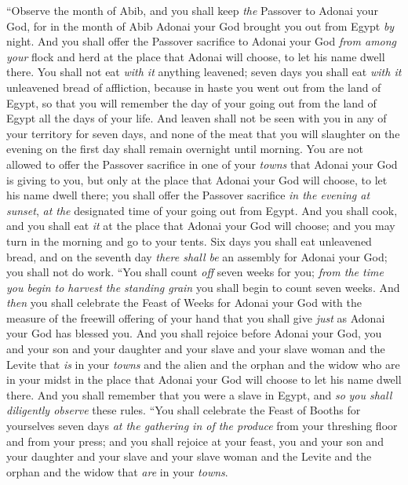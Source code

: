 \begin{biblechapter} %
\verse “Observe the month of Abib, and you shall keep \textit{the} Passover to Adonai your God, for in the month of Abib Adonai your God brought you out from Egypt \textit{by} night.
\verse And you shall offer the Passover sacrifice to Adonai your God \textit{from among} \textit{your} flock and herd at the place that Adonai will choose, to let his name dwell there.
\verse You shall not eat \textit{with it} anything leavened; seven days you shall eat \textit{with it} unleavened bread of affliction, because in haste you went out from the land of Egypt, so that you will remember the day of your going out from the land of Egypt all the days of your life.
\verse And leaven shall not be seen with you in any of your territory for seven days, and none of the meat that you will slaughter on the evening on the first day shall remain overnight until morning.
\verse You are not allowed to offer the Passover sacrifice in one of your \textit{towns} that Adonai your God is giving to you,
\verse but only at the place that Adonai your God will choose, to let his name dwell there; you shall offer the Passover sacrifice \textit{in the evening at sunset}, \textit{at the} designated time of your going out from Egypt.
\verse And you shall cook, and you shall eat \textit{it} at the place that Adonai your God will choose; and you may turn in the morning and go to your tents.
\verse Six days you shall eat unleavened bread, and on the seventh day \textit{there shall be} an assembly for Adonai your God; you shall not do work.
\verse “You shall count \textit{off} seven weeks for you; \textit{from the time you begin to harvest the standing grain} you shall begin to count seven weeks.
\verse And \textit{then} you shall celebrate the Feast of Weeks for Adonai your God with the measure of the freewill offering of your hand that you shall give \textit{just} as Adonai your God has blessed you.
\verse And you shall rejoice before Adonai your God, you and your son and your daughter and your slave and your slave woman and the Levite that \textit{is} in your \textit{towns} and the alien and the orphan and the widow who are in your midst in the place that Adonai your God will choose to let his name dwell there.
\verse And you shall remember that you were a slave in Egypt, and \textit{so} \textit{you shall diligently observe} these rules.
\verse “You shall celebrate the Feast of Booths for yourselves seven days \textit{at the gathering in of the produce} from your threshing floor and from your press;
\verse and you shall rejoice at your feast, you and your son and your daughter and your slave and your slave woman and the Levite and the orphan and the widow that \textit{are} in your \textit{towns}.

\end{biblechapter}

